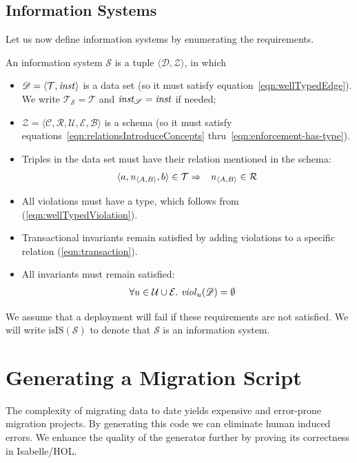 \documentclass[runningheads]{llncs}
\newcommand{\id}[1]{\text{\it #1\/}}
\newcommand{\instance}{\mathbin{\id{inst}}}
\newcommand{\viol}[2]{\violC{#1}(#2)}
\newcommand{\violC}[1]{\id{viol}_{#1}}
\newcommand{\declare}[3]{\id{#1}_{\pair{#2}{#3}}}
\newcommand{\pair}[2]{\langle{#1},{#2}\rangle}
\newcommand{\triple}[3]{\langle{#1},{#2},{#3}\rangle}
\newcommand{\quintuple}[5]{\langle{#1},{#2},{#3},{#4},{#5}\rangle}
\newcommand{\concepts}{\mathcal{C}}
\newcommand{\rels}{\mathcal{R}}   %
\newcommand{\triples}{\mathcal{T}}
\newcommand{\rules}{\mathcal{U}}
\newcommand{\transactions}{\mathcal{E}}
\newcommand{\busConstraints}{\mathcal{B}}
\newcommand{\dataset}{\mathscr{D}}
\newcommand{\schema}{\mathscr{Z}}
\newcommand{\infsys}{\mathscr{S}}
\begin{document}
\subsection{Information Systems}
\label{sct:Information Systems}
   Let us now define information systems by enumerating the requirements.
\begin{definition}
\label{def:information system}
\item An information system $\infsys$ is a tuple $\pair{\dataset}{\schema}$, in which
\begin{itemize}
\item $\dataset=\pair{\triples}{\instance}$ is a data set (so it must satisfy equation~\ref{eqn:wellTypedEdge}).
   We write $\triples_\infsys = \triples$ and $\instance_\infsys = \instance$ if needed;
\item $\schema=\quintuple{\concepts}{\rels}{\rules}{\transactions}{\busConstraints}$ is a schema (so it must satisfy equations~\ref{eqn:relationsIntroduceConcepts} thru~\ref{eqn:enforcement-has-type}).
\item Triples in the data set must have their relation mentioned in the schema:
   \begin{eqnarray}
      \triple{a}{\declare{n}{A}{B}}{b}\in\triples&\Rightarrow&\declare{n}{A}{B}\in\rels
   \label{eqn:define R}
   \end{eqnarray}
\item All violations must have a type, which follows from  (\ref{eqn:wellTypedViolation}).
\item Transactional invariants remain satisfied by adding violations to a specific relation (\ref{eqn:transaction}).
\item All invariants must remain satisfied:
   \begin{align}
      \forall u\in\rules\cup\transactions&.~\viol{u}{\dataset}=\emptyset
   \label{eqn:satisfaction}
   \end{align}
\end{itemize}
\end{definition}
   We assume that a deployment will fail if these requirements are not satisfied.
   We will write $\text{isIS}(\infsys)$ to denote that $\infsys$ is an information system.

\section{Generating a Migration Script}
\label{sct:Generating}
   The complexity of migrating data to date yields expensive and error-prone migration projects.
   By generating this code we can eliminate human induced errors.
   We enhance the quality of the generator further by proving its correctness in Isabelle/HOL.
   
\end{document}
